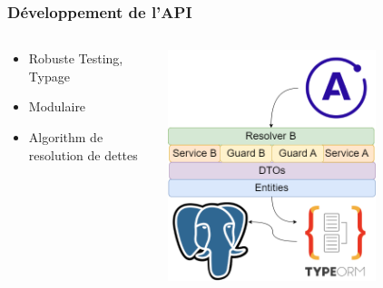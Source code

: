 \documentclass[aspectratio=169]{beamer}
\begin{document}
    \begin{frame}
        \frametitle{Développement de l'API}
        \begin{columns}
            \begin{column}{0.5\textwidth}
                \begin{itemize}
                    \item Robuste Testing, Typage
                    \item Modulaire
                    \item Algorithm de resolution de dettes
                \end{itemize}
            \end{column}

            \begin{column}{0.5\textwidth}
                \begin{flushleft}
                    \includegraphics[width=0.7\textwidth]{imgs/module}\label{fig:figure4}
                \end{flushleft}
            \end{column}
        \end{columns}

    \end{frame}
\end{document}
